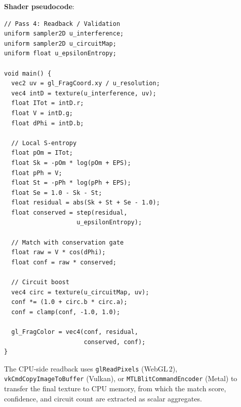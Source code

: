 \documentclass[11pt,twocolumn,a4paper]{article}
\begin{document}
\textbf{Shader pseudocode}:
\begin{lstlisting}[style=glsl]
// Pass 4: Readback / Validation
uniform sampler2D u_interference;
uniform sampler2D u_circuitMap;
uniform float u_epsilonEntropy;

void main() {
  vec2 uv = gl_FragCoord.xy / u_resolution;
  vec4 intD = texture(u_interference, uv);
  float ITot = intD.r;
  float V = intD.g;
  float dPhi = intD.b;

  // Local S-entropy
  float pOm = ITot;
  float Sk = -pOm * log(pOm + EPS);
  float pPh = V;
  float St = -pPh * log(pPh + EPS);
  float Se = 1.0 - Sk - St;
  float residual = abs(Sk + St + Se - 1.0);
  float conserved = step(residual,
                    u_epsilonEntropy);

  // Match with conservation gate
  float raw = V * cos(dPhi);
  float conf = raw * conserved;

  // Circuit boost
  vec4 circ = texture(u_circuitMap, uv);
  conf *= (1.0 + circ.b * circ.a);
  conf = clamp(conf, -1.0, 1.0);

  gl_FragColor = vec4(conf, residual,
                      conserved, conf);
}
\end{lstlisting}

The CPU-side readback uses \texttt{glReadPixels} (WebGL\,2),
\texttt{vkCmdCopyImageToBuffer} (Vulkan), or
\texttt{MTLBlitCommandEncoder} (Metal) to transfer the final texture
to CPU memory, from which the match score, confidence, and circuit
count are extracted as scalar aggregates.

\end{document}
